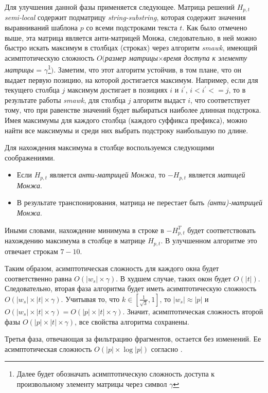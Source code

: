 Для улучшения данной фазы применяется следующее.
Матрица решений $H_{p,t}$ \emph{semi-local} содержит подматрицу \emph{string-substring}, которая содержит значения выравниваний шаблона $p$ со всеми подстроками текста $t$. 
Как было отмечено выше, эта матрица является анти-матрицей Монжа, следовательно, в ней можно быстро искать максимум в столбцах (строках) через алгоритм \emph{smawk}, имеющий асимптотическую сложность $O($\emph{размер матрицы}$\times$\emph{время доступа к элементу матрицы} = $\gamma$\footnote{Далее будет обозначать асимптотическую сложность доступа к произвольному элементу матрицы через символ $\gamma$}$)$.
Заметим, что этот алгоритм устойчив, в том плане, что он выдает первую позицию, на которой достигается максимум.
Например, если для текущего столбца $j$  максимум достигает в позициях $i$ и $i^{'}$, $i<i^{'}<=j$, то в результате работы \emph{smawk}, для столбца $j$ алгоритм выдаст $i$, что соответствует тому, что при равенстве значений будет выбираться наиболее длинная подстрока.
Имея максимумы для каждого столбца (каждого суффикса префикса), можно найти все максимумы и среди них выбрать подстроку наибольшую по длине.

Для нахождения максимума в столбце воспользуемся следующими соображениями.
\begin{itemize}
    \item  Если $H_{p,t}$ является \emph{анти-матрицей Монжа}, то $-H_{p,t}$ является \emph{матицей Монжа}.
    \item В результате транспонирования, матрица не перестает быть \emph{(анти)-матрицей Монжа}.
\end{itemize}
Иными словами, нахождение минимума в  строке в $-H_{p,t}^{T}$ будет соответствовать нахождению максимума в столбце в матрице $H_{p,t}$. 
В улучшенном алгоритме это отвечает строкам $7-10$.

Таким образом, асимптотическая сложность для каждого окна будет соответственно равна $O(|w_{s}| \times \gamma) $.
В худшем случае, таких окон будет $O(|t|)$.
Следовательно, вторая фаза алгоритма будет иметь асимптотическую сложность  $O(|w_{s}| \times |t| \times \gamma )$.
Учитывая то, что $k \in [\frac{1}{\sqrt{3}},1]$, то $|w_{s}| \approx |p|$ и $O(|w_{s}| \times |t| \times \gamma)=O(|p| \times |t| \times \gamma)$.
Значит, асимптотическая сложность второй фазы $O(|p| \times |t| \times \gamma )$, все свойства алгоритма сохранены.

Третья фаза, отвечающая за фильтрацию фрагментов, остается без изменений. Ее асимптотическая сложность $O(|p| \times \log |p|)$ согласно \cite{luciv2019interactive}.

